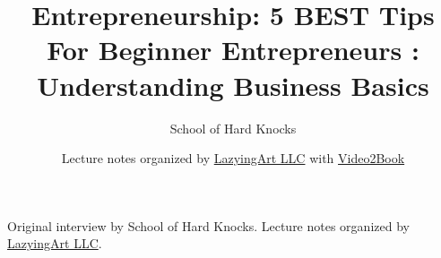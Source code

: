 \documentclass[11pt,oneside]{book}
\begin{document}
\frontmatter
\title{Entrepreneurship: 5 BEST Tips For Beginner Entrepreneurs : Understanding Business Basics}
\author{School of Hard Knocks}
\date{Lecture notes organized by \href{https://lazying.art}{LazyingArt LLC} with \href{https://github.com/lachlanchen/Video2Book}{Video2Book}}
\maketitle
\begin{center}
\small Original interview by School of Hard Knocks. Lecture notes organized by \href{https://lazying.art}{LazyingArt LLC}.
\end{center}
\clearpage
\mainmatter

\end{document}

